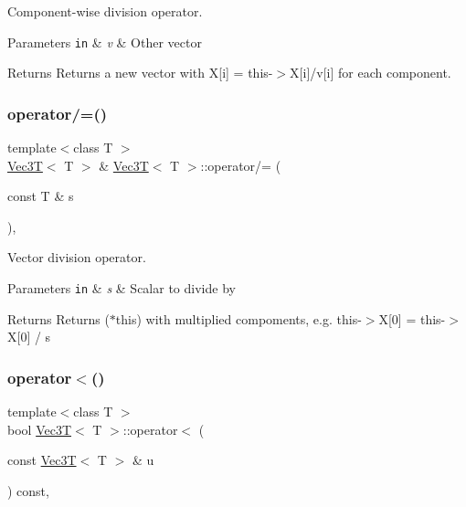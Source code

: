 Component-\/wise division operator. 


\begin{DoxyParams}[1]{Parameters}
\mbox{\tt in}  & {\em v} & Other vector \\
\hline
\end{DoxyParams}
\begin{DoxyReturn}{Returns}
Returns a new vector with X\mbox{[}i\mbox{]} = this-\/$>$X\mbox{[}i\mbox{]}/v\mbox{[}i\mbox{]} for each component. 
\end{DoxyReturn}
\mbox{\label{classVec3T_a9446e83162d3daee6133d12b354a3a41}} 
\subsubsection{\texorpdfstring{operator/=()}{operator/=()}}
{\footnotesize\ttfamily template$<$class T $>$ \\
\hyperlink{classVec3T}{Vec3T}$<$ T $>$ \& \hyperlink{classVec3T}{Vec3T}$<$ T $>$\+::operator/= (\begin{DoxyParamCaption}\item[{const T \&}]{s }\end{DoxyParamCaption})\hspace{0.3cm}{\ttfamily [inline]}, {\ttfamily [noexcept]}}



Vector division operator. 


\begin{DoxyParams}[1]{Parameters}
\mbox{\tt in}  & {\em s} & Scalar to divide by \\
\hline
\end{DoxyParams}
\begin{DoxyReturn}{Returns}
Returns ($\ast$this) with multiplied compoments, e.\+g. this-\/$>$X\mbox{[}0\mbox{]} = this-\/$>$X\mbox{[}0\mbox{]} / s 
\end{DoxyReturn}
\mbox{\label{classVec3T_aba830919c5020bb060f39fe9df6b7ca1}} 
\subsubsection{\texorpdfstring{operator$<$()}{operator<()}}
{\footnotesize\ttfamily template$<$class T $>$ \\
bool \hyperlink{classVec3T}{Vec3T}$<$ T $>$\+::operator$<$ (\begin{DoxyParamCaption}\item[{const \hyperlink{classVec3T}{Vec3T}$<$ T $>$ \&}]{u }\end{DoxyParamCaption}) const\hspace{0.3cm}{\ttfamily [inline]}, {\ttfamily [noexcept]}}



